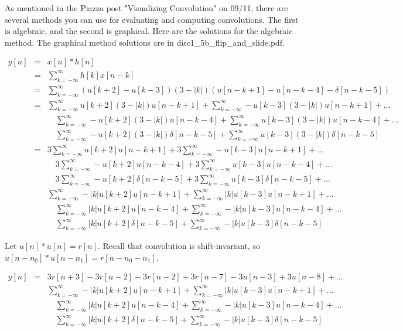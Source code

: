 \documentclass[11pt]{article}
\begin{document}
{\color{blue}
As mentioned in the Piazza post "Visualizing Convolution" on 09/11, there are several methods you can use for evaluating and computing convolutions. The first is algebraic, and the second is graphical. Here are the solutions for the algebraic method. The graphical method solutions are in disc1\_5b\_flip\_and\_slide.pdf.

\begin{eqnarray*}
y[n] &=& x[n]*h[n] \\
&=& \sum\limits_{k=-\infty}^\infty h[k]x[n-k] \\
&=& \sum\limits_{k=-\infty}^\infty \left(u[k+2]-u[k-3]\right)\left(3-|k|\right)\left( u[n-k+1]-u[n-k-4]-\delta[n-k-5] \right)\\
&=& \sum\limits_{k=-\infty}^\infty u[k+2]\left(3-|k|\right)u[n-k+1] + \sum\limits_{k=-\infty}^\infty -u[k-3]\left(3-|k|\right)u[n-k+1] + \ldots \\
&& \quad \sum\limits_{k=-\infty}^\infty -u[k+2]\left(3-|k|\right)u[n-k-4] + \sum\limits_{k=-\infty}^\infty u[k-3]\left(3-|k|\right)u[n-k-4] + \ldots \\
&& \quad \sum\limits_{k=-\infty}^\infty -u[k+2]\left(3-|k|\right)\delta[n-k-5] + \sum\limits_{k=-\infty}^\infty u[k-3]\left(3-|k|\right)\delta[n-k-5] \\
&=& 3\sum\limits_{k=-\infty}^\infty u[k+2]u[n-k+1] + 3\sum\limits_{k=-\infty}^\infty -u[k-3]u[n-k+1] + \ldots \\
&& \quad 3\sum\limits_{k=-\infty}^\infty -u[k+2]u[n-k-4] + 3\sum\limits_{k=-\infty}^\infty u[k-3]u[n-k-4] + \ldots \\
&& \quad 3\sum\limits_{k=-\infty}^\infty -u[k+2]\delta[n-k-5] + 3\sum\limits_{k=-\infty}^\infty u[k-3]\delta[n-k-5] + \ldots \\
&& \sum\limits_{k=-\infty}^\infty -|k|u[k+2]u[n-k+1] + \sum\limits_{k=-\infty}^\infty |k|u[k-3]u[n-k+1] + \ldots \\
&& \quad \sum\limits_{k=-\infty}^\infty |k|u[k+2]u[n-k-4] + \sum\limits_{k=-\infty}^\infty -|k| u[k-3]u[n-k-4] + \ldots \\
&& \quad \sum\limits_{k=-\infty}^\infty |k|u[k+2]\delta[n-k-5] + \sum\limits_{k=-\infty}^\infty -|k|u[k-3]\delta[n-k-5] 
\end{eqnarray*}

Let $u[n]*u[n] = r[n]$. Recall that convolution is shift-invariant, so $u[n-n_0]*u[n-n_1]=r[n-n_0-n_1]$.

\begin{eqnarray*}
y[n] &=& 3r[n+3] - 3r[n-2] - 3r[n-2] + 3r[n-7] - 3u[n-3] + 3u[n-8] + \ldots \\
&& \sum\limits_{k=-\infty}^\infty -|k|u[k+2]u[n-k+1] + \sum\limits_{k=-\infty}^\infty |k|u[k-3]u[n-k+1] + \ldots \\
&& \quad \sum\limits_{k=-\infty}^\infty |k|u[k+2]u[n-k-4] + \sum\limits_{k=-\infty}^\infty -|k| u[k-3]u[n-k-4] + \ldots \\
&& \quad \sum\limits_{k=-\infty}^\infty |k|u[k+2]\delta[n-k-5] + \sum\limits_{k=-\infty}^\infty -|k|u[k-3]\delta[n-k-5] 
\end{eqnarray*}

}
\end{document}
